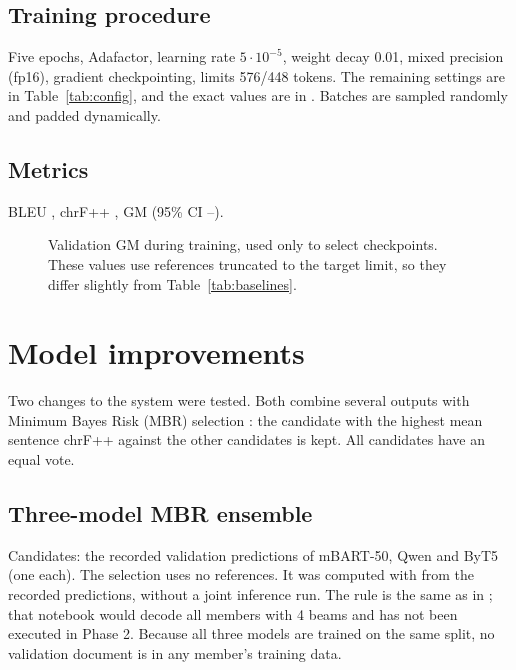 \documentclass[a4paper,12pt]{article}
\begin{document}
\subsection{Training procedure}
Five epochs, Adafactor, learning rate $5\cdot10^{-5}$, weight decay 0.01, mixed precision (fp16), gradient checkpointing, limits 576/448 tokens. The remaining settings are in Table~\ref{tab:config}, and the exact values are in . Batches are sampled randomly and padded dynamically.

\subsection{Metrics}
BLEU \MbBLEU, chrF++ \MbCHR, GM \MbGM{} (95\% CI \MbLO--\MbHI).

\begin{figure}[H]
    \centering
    \caption{Validation GM during training, used only to select checkpoints. These values use references truncated to the target limit, so they differ slightly from Table~\ref{tab:baselines}.}
    \label{fig:curves}
\end{figure}

\section{Model improvements}
\label{sec:improvements}
Two changes to the system were tested. Both combine several outputs with Minimum Bayes Risk (MBR) selection \cite{mbr}: the candidate with the highest mean sentence chrF++ against the other candidates is kept. All candidates have an equal vote.

\subsection{Three-model MBR ensemble}
Candidates: the recorded validation predictions of mBART-50, Qwen and ByT5 (one each). The selection uses no references. It was computed with  from the recorded predictions, without a joint inference run. The rule is the same as in ; that notebook would decode all members with 4 beams and has not been executed in Phase 2. Because all three models are trained on the same split, no validation document is in any member's training data.
\end{document}
